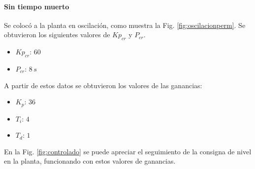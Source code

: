 \paragraph{Sin tiempo muerto}

Se colocó a la planta en oscilación, como muestra la Fig.
\ref{fig:oscilacionperm}. Se obtuvieron los siguientes valores de $Kp_{cr} $ y
$P_{cr}$.

\begin{itemize}
 \item $Kp_{cr}$:
 $60$
 \item $P_{cr}$:
 $8\,s$
\end{itemize}

A partir de estos datos se obtuvieron los valores de las ganancias:

\begin{itemize}
 \item $K_p $: $36$
 \item $T_i $: $4$
 \item $T_d $: $1$ 
\end{itemize}

En la Fig. \ref{fig:controlado} se puede apreciar el seguimiento de la
consigna de nivel en la planta, funcionando con estos valores de ganancias.

